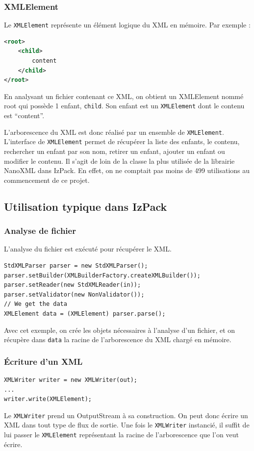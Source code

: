 \subsubsection{XMLElement}
Le \verb|XMLElement| représente un élément logique du XML en mémoire. Par exemple :
\begin{lstlisting}[language=XML]
<root>
	<child>
		content
	</child>
</root>
\end{lstlisting}
En analysant un fichier contenant ce XML, on obtient un XMLElement nommé root qui possède 1 enfant, \verb|child|. Son enfant est un \verb|XMLElement| dont le contenu est ``content''.

L'arborescence du XML est donc réalisé par un ensemble de \verb|XMLElement|.
L'interface de \verb|XMLElement| permet de récupérer la liste des enfants, le contenu, rechercher un enfant par son nom, retirer un enfant, ajouter un enfant ou modifier le contenu.
Il s'agit de loin de la classe la plus utilisée de la librairie NanoXML dans IzPack.
En effet, on ne comptait pas moins de 499 utilisations au commencement de ce projet.

\subsection{Utilisation typique dans IzPack}
\subsubsection{Analyse de fichier}
L'analyse du fichier est exécuté pour récupérer le XML.
\begin{lstlisting}
StdXMLParser parser = new StdXMLParser();
parser.setBuilder(XMLBuilderFactory.createXMLBuilder());
parser.setReader(new StdXMLReader(in));
parser.setValidator(new NonValidator());
// We get the data
XMLElement data = (XMLElement) parser.parse();
\end{lstlisting}
Avec cet exemple, on crée les objets nécessaires à l'analyse d'un fichier, et on récupère dans \verb|data| la racine de l'arborescence du XML chargé en mémoire.
\subsubsection{Écriture d'un XML}
\begin{lstlisting}
XMLWriter writer = new XMLWriter(out);
...
writer.write(XMLElement);
\end{lstlisting}
Le \verb|XMLWriter| prend un OutputStream à sa construction.
On peut donc écrire un XML dans tout type de flux de sortie. 
Une fois le \verb|XMLWriter| instancié, il suffit de lui passer le \verb|XMLElement| représentant la racine de l'arborescence que l'on veut écrire.
